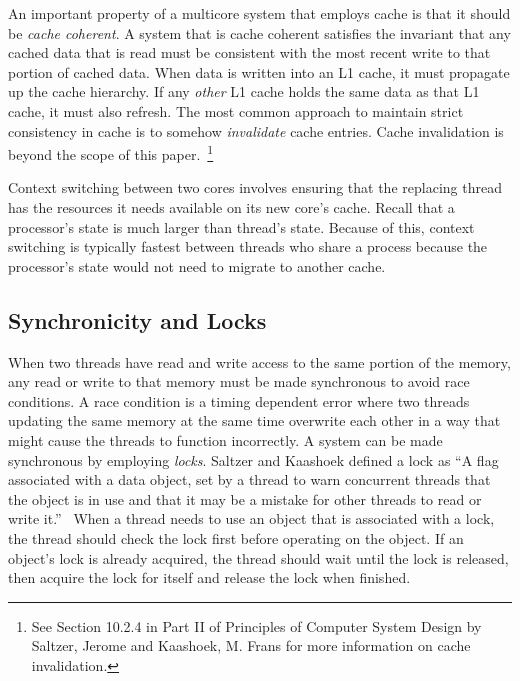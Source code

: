 \documentclass{sig-alternate}
\begin{document}


An important property of a multicore system that employs cache is that it should be \emph{cache coherent}. A system that is cache coherent satisfies the invariant that any cached data that is read must be consistent with the most recent write to that portion of cached data. When data is written into an L1 cache, it must propagate up the cache hierarchy. If any \emph{other} L1 cache holds the same data as that L1 cache, it must also refresh. The most common approach to maintain strict consistency in cache is to somehow \emph{invalidate} cache entries. Cache invalidation is beyond the scope of this paper.~\footnote{See Section 10.2.4 in Part II of Principles of Computer System Design by Saltzer, Jerome and Kaashoek, M. Frans for more information on cache invalidation.}~\cite{Systems}

Context switching between two cores involves ensuring that the replacing thread has the resources it needs available on its new core's cache. Recall that a processor's state is much larger than thread's state. Because of this, context switching is typically fastest between threads who share a process because the processor's state would not need to migrate to another cache.

\subsection{Synchronicity and Locks}
\label{sec:locks}

When two threads have read and write access to the same portion of the memory, any read or write to that memory must be made synchronous to avoid race conditions. A race condition is a timing dependent error where two threads updating the same memory at the same time overwrite each other in a way that might cause the threads to function incorrectly. A system can be made synchronous by employing \emph{locks}. Saltzer and Kaashoek defined a lock as ``A flag associated with a data object, set by a thread to warn concurrent threads that the object is in use and that it may be a mistake for other threads to read or write it.''~\cite{Systems}
When a thread needs to use an object that is associated with a lock, the thread should check the lock first before operating on the object. If an object's lock is already acquired, the thread should wait until the lock is released, then acquire the lock for itself and release the lock when finished.
\end{document}
